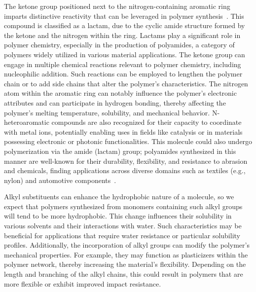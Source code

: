 The ketone group positioned next to the nitrogen-containing aromatic ring imparts distinctive reactivity that can be leveraged in polymer synthesis~\cite{McQuarrieSimonPhysicalChemistry,CareySundbergAdvancedOrganicChemistry,Varghese2022BeyondApplications,Varghese2022BeyondApplications}. This compound is classified as a lactam, due to the cyclic amide structure formed by the ketone and the nitrogen within the ring. Lactams play a significant role in polymer chemistry, especially in the production of polyamides, a category of polymers widely utilized in various material applications. The ketone group can engage in multiple chemical reactions relevant to polymer chemistry, including nucleophilic addition. Such reactions can be employed to lengthen the polymer chain or to add side chains that alter the polymer’s characteristics. The nitrogen atom within the aromatic ring can notably influence the polymer’s electronic attributes and can participate in hydrogen bonding, thereby affecting the polymer's melting temperature, solubility, and mechanical behavior. N-heteroaromatic compounds are also recognized for their capacity to coordinate with metal ions, potentially enabling uses in fields like catalysis or in materials possessing electronic or photonic functionalities. This molecule could also undergo polymerization via the amide (lactam) group; polyamides synthesized in this manner are well-known for their durability, flexibility, and resistance to abrasion and chemicals, finding applications across diverse domains such as textiles (e.g., nylon) and automotive components~\cite{Varghese2022BeyondApplications,Varghese2022BeyondApplications}.

Alkyl substituents can enhance the hydrophobic nature of a molecule, so we expect that polymers synthesized from monomers containing such alkyl groups will tend to be more hydrophobic. This change influences their solubility in various solvents and their interactions with water. Such characteristics may be beneficial for applications that require water resistance or particular solubility profiles. Additionally, the incorporation of alkyl groups can modify the polymer's mechanical properties. For example, they may function as plasticizers within the polymer network, thereby increasing the material's flexibility. Depending on the length and branching of the alkyl chains, this could result in polymers that are more flexible or exhibit improved impact resistance.


